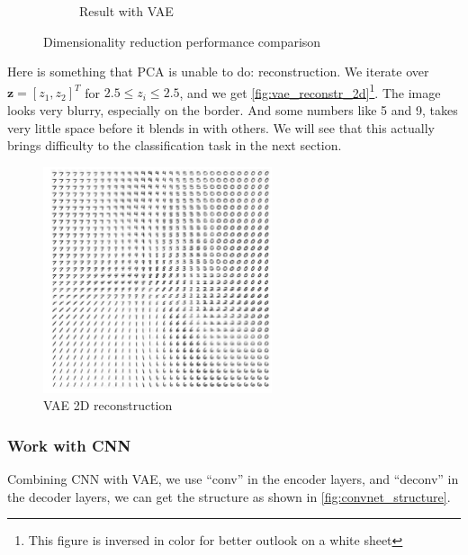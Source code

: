 \documentclass[a4paper,10pt,UTF8]{article}
\renewcommand*{\vec}[1]{\boldsymbol{#1}}
\numberwithin{equation}{section}
\numberwithin{figure}{section}
\begin{document}
\begin{figure}[htbp]
\begin{subfigure}[h]{0.49\linewidth}
        \caption{Result with VAE}
    \end{subfigure}
    \caption{Dimensionality reduction performance comparison}
    \label{fig:vae_vs_pca_dimreduce}
\end{figure}

Here is something that PCA is unable to do: reconstruction. We iterate over $\vec{z} = [z_1,z_2]^T$ for $2.5 \le z_i \le 2.5$, and we get \autoref{fig:vae_reconstr_2d}\footnote{This figure is inversed in color for better outlook on a white sheet}. The image looks very blurry, especially on the border. And some numbers like 5 and 9, takes very little space before it blends in with others. We will see that this actually brings difficulty to the classification task in the next section.

\begin{figure}[htbp]
\centering
\includegraphics[width=0.6\textwidth]{img/reconstr_2d.png}
\caption{VAE 2D reconstruction}
\label{fig:vae_reconstr_2d}
\end{figure}

\subsubsection{Work with CNN}

Combining CNN with VAE, we use ``conv'' in the encoder layers, and ``deconv'' in the decoder layers, we can get the structure as shown in \autoref{fig:convnet_structure}.
\end{document}

